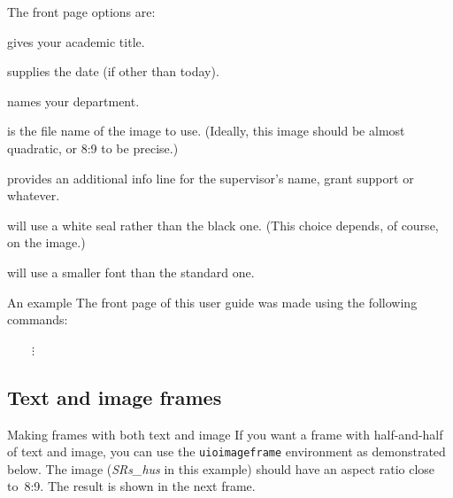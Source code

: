 \documentclass[UKenglish,aspectratio=169]{beamer}
\newcommand{\Dots}{\ensuremath{\ldots}}
\newcommand{\p}[1]{\texttt{#1}}
\newcommand{\pb}[1]{\textbf{\p{#1}}}
\newcommand{\pcmd}[1]{\p{\textbackslash #1}}
\newcommand{\ppar}[1]{\p{\{#1\}}}
\begin{document}
\begin{frame}[label=fp-options]
  The front page options are:

  \medskip
  \begin{description}[\pb{academictitle=\ppar{\Dots}}]
  \item[\pb{academictitle=\ppar{\Dots}}] gives your academic title.
  \item[\pb{date=\ppar{\Dots}}] supplies the date (if other than
    today).
  \item[\pb{dept=\ppar{\Dots}}] names your department.
  \item[\pb{image=\ppar{\Dots}}] is the file name of the image to
    use. (Ideally, this image should be almost quadratic, or 8:9 to be
    precise.)
  \item[\pb{info=\ppar{\Dots}}] provides an additional info line for
    the supervisor's name, grant support or whatever.
  \item[\pb{inverted}] will use a white seal rather than the black
    one. (This choice depends, of course, on the image.)
  \item[\pb{smaller}] will use a smaller font than the standard one.
  \end{description}
\end{frame}

\begin{frame}[fragile]{An example}
  The front page of this user guide was made using the following commands:

  \medskip
  ~~~~$\vdots$
\end{frame}

\subsection{Text and image frames}

\begin{frame}{Making frames with both text and image}
  If you want a frame with half-and-half of text and image, you can use the
  \p{uioimageframe} environment as demonstrated below. The image
  (\emph{SRs\_hus} in this example) should have an aspect ratio close
  to~8:9. The result is shown in the next frame.

  \medspace
\end{frame}
\end{document}
